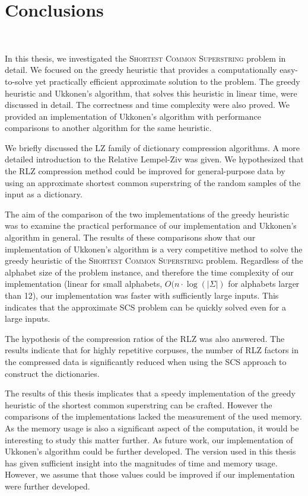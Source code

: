 \documentclass[english,twoside,censored,csm,algorithms-track-2020]{HYthesisML}
\theoremstyle{plain}
\theoremstyle{definition}
\begin{document}
\chapter{Conclusions}~\label{chp-conc}

In this thesis, we investigated the \textsc{Shortest Common Superstring} problem
in detail. We focused on the greedy heuristic that provides a computationally
easy-to-solve yet practically efficient approximate solution to the problem.
The greedy heuristic and Ukkonen's algorithm, that solves this heuristic in linear time,
were discussed in detail. The correctness and time complexity were also proved.
We provided an implementation of Ukkonen's algorithm with performance
comparisons to another algorithm for the same heuristic.

We briefly discussed the LZ family of dictionary compression algorithms.
A more detailed introduction to the Relative Lempel-Ziv was given.
We hypothesized that the RLZ compression method could be improved for
general-purpose data by using an approximate shortest common
superstring of the random samples of the input as a dictionary. 

The aim of the comparison of the two implementations of the
greedy heuristic was to examine the practical performance
of our implementation and Ukkonen's algorithm in general.
The results of these comparisons show that our implementation
of Ukkonen's algorithm is a very competitive method to solve
the greedy heuristic of the \textsc{Shortest Common Superstring}
problem. Regardless of the alphabet size of the problem instance,
and therefore the time complexity of our implementation
(linear for small alphabets, $O(n\cdot\log(|\Sigma|)$ for
alphabets larger than 12), our implementation was faster with
sufficiently large inputs. This indicates that the approximate
SCS problem can be quickly solved even for a large inputs.

The hypothesis of the compression ratios of the RLZ was also
answered. The results indicate that for highly repetitive
corpuses, the number of RLZ factors in the compressed data
is significantly reduced when using the SCS approach to
construct the dictionaries.

The results of this thesis implicates that a speedy implementation of the greedy heuristic of
the shortest common superstring can be crafted.
However the comparisons of the implementations lacked the
measurement of the used memory. As the memory usage is also
a significant aspect of the computation, it would be
interesting to study this matter further. As future
work, our implementation of Ukkonen's algorithm could
be further developed. The version used in this thesis
has given sufficient insight into the magnitudes of
time and memory usage. However, we assume that those
values could be improved if our implementation were
further developed.
\end{document}
